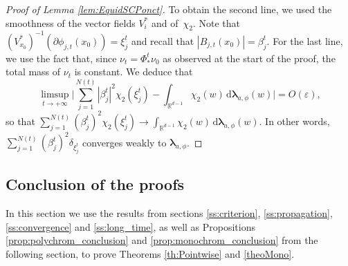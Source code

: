 \documentclass[10pt]{amsart}
\newcommand{\rd}{\,\mathrm{d}}
\theoremstyle{plain}
\theoremstyle{definition}
\begin{document}
\begin{proof}[Proof of Lemma \ref{lem:EquidSCPonct}]
To obtain the second line, we used the smoothness of the vector fields $V_i^*$ and of~$\chi_2$. Note that $ (V_{x_0}^*)^{-1}\left(\partial \phi_{j,t}(x_0)\right) = \xi_j^t$ and recall that $|B_{j,t}(x_0)|=\beta_j^t$. For the last line, we use the fact that, since $\nu_t=\Phi^t_*\nu_0$ as observed at the start of the proof, the total mass of $\nu_t$ is constant. We deduce that
\[
\limsup\limits_{t\to +\infty} \biggl|\sum_{j=1}^{N(t)}|\beta_j^t|^2 \chi_2(\xi_j^t) - \int_{\mathbb{R}^{d-1}} \chi_2(w) \rd \boldsymbol{\lambda}_{a,\phi}(w) \biggr| = O(\varepsilon),
\]
so that $\sum_{j=1}^{N(t)}(\beta_j^t)^2 \chi_2(\xi_j^t) \to \int_{\mathbb{R}^{d-1}} \chi_2(w) \rd \boldsymbol{\lambda}_{a,\phi}(w)$. In other words, $\sum_{j=1}^{N(t)} (\beta_j^t)^2 \delta_{\xi_j^t}$ converges weakly to $\boldsymbol{\lambda}_{a,\phi}$.
\end{proof}

\subsection{Conclusion of the proofs}\label{ss:conclusion}

In this section we use the results from sections \ref{ss:criterion}, \ref{ss:propagation}, \ref{ss:convergence} and \ref{ss:long_time}, as well as Propositions \ref{prop:polychrom_conclusion} and \ref{prop:monochrom_conclusion} from the following section, to prove Theorems \ref{th:Pointwise} and \ref{theoMono}.
\end{document}

